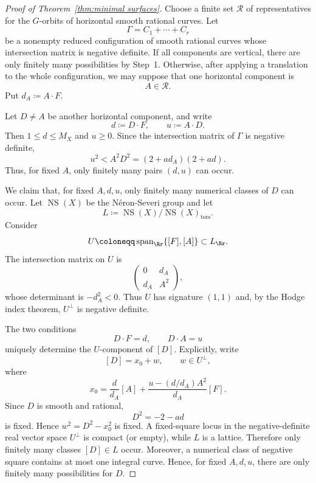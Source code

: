 \documentclass[12pt]{amsart}
\newcommand{\NS}{\operatorname{NS}}
\begin{document}
\begin{proof}[Proof of Theorem~\ref{thm:minimal surfaces}]
Choose a finite set $\mathcal R$ of representatives for the $G$-orbits of
horizontal smooth rational curves.  Let
\[
    \Gamma=C_1+\cdots+C_r
\]
be a nonempty reduced configuration of smooth rational curves whose
intersection matrix is negative definite.  If all components are vertical,
there are only finitely many possibilities by Step~1.  Otherwise, after
applying a translation to the whole configuration, we may suppose that one
horizontal component is
\[
    A\in\mathcal R.
\]
Put $d_A\coloneqq A\cdot F$.

Let $D\neq A$ be another horizontal component, and write
\[
    d\coloneqq D\cdot F,
    \qquad
    u\coloneqq A\cdot D.
\]
Then $1\leq d\leq M_X$ and $u\geq0$.  Since the intersection matrix of $\Gamma$ is negative definite,
\begin{equation}\label{eq:two-curve-negative-definite-bound}
    u^2<A^2D^2=(2+ad_A)(2+ad).
\end{equation}
Thus, for fixed $A$, only finitely many pairs $(d,u)$ can occur.

We claim that, for fixed $A,d,u$, only finitely many numerical classes of $D$
can occur.  Let $\NS(X)$ be the N\'eron-Severi group and let
\[
    L\coloneqq \NS(X)/\NS(X)_{\mathrm{tors}}.
\]
Consider
\[
    U\coloneqq \operatorname{span}_{\Rr}\{[F],[A]\}\subset L_{\Rr}.
\]
The intersection matrix on $U$ is
\[
    \begin{pmatrix}
        0&d_A\\
        d_A&A^2
    \end{pmatrix},
\]
whose determinant is $-d_A^2<0$.  Thus $U$ has signature $(1,1)$ and, by the
Hodge index theorem, $U^\perp$ is negative definite.

The two conditions
\[
    D\cdot F=d,
    \qquad
    D\cdot A=u
\]
uniquely determine the $U$-component of $[D]$.  Explicitly, write
\[
    [D]=x_0+w,
    \qquad w\in U^\perp,
\]
where
\begin{equation}\label{eq:x0-lattice-general}
    x_0=
    \frac d{d_A}[A]
    +\frac{u-(d/d_A)A^2}{d_A}[F].
\end{equation}
Since $D$ is smooth and rational,
\[
    D^2=-2-ad
\]
is fixed.  Hence $w^2=D^2-x_0^2$ is fixed.  A fixed-square locus in the
negative-definite real vector space $U^\perp$ is compact (or empty), while
$L$ is a lattice.  Therefore only finitely many classes $[D]\in L$ occur.
Moreover, a numerical class of negative square contains at most one integral
curve.  Hence, for fixed $A,d,u$, there are only finitely many possibilities
for $D$.


\end{proof}
\end{document}
